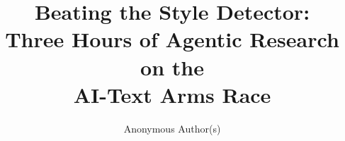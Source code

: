 \documentclass[runningheads]{llncs}
\providecommand{\ifanonymous}{}  %
\newif\ifanonymous \anonymoustrue
\begin{document}
\title{Beating the Style Detector:\\
       Three Hours of Agentic Research on the\\
       AI-Text Arms Race}


\ifanonymous
  \author{Anonymous Author(s)}
\else
  \author{Andreas K. Maier\inst{1} \and
          Moritz Zaiss\inst{2,1} \and
          Siming Bayer\inst{1}}
  \authorrunning{A.\,K. Maier, M. Zaiss, S. Bayer}
  \institute{Pattern Recognition Lab, Friedrich-Alexander-Universit\"at
    Erlangen-N\"urnberg, Erlangen, Germany \\
    \email{andreas.maier@fau.de}
    \and
    Institute of Neuroradiology, University Hospital Erlangen,
    Friedrich-Alexander-Universit\"at Erlangen-N\"urnberg,
    Erlangen, Germany}
\fi

\maketitle
\end{document}
